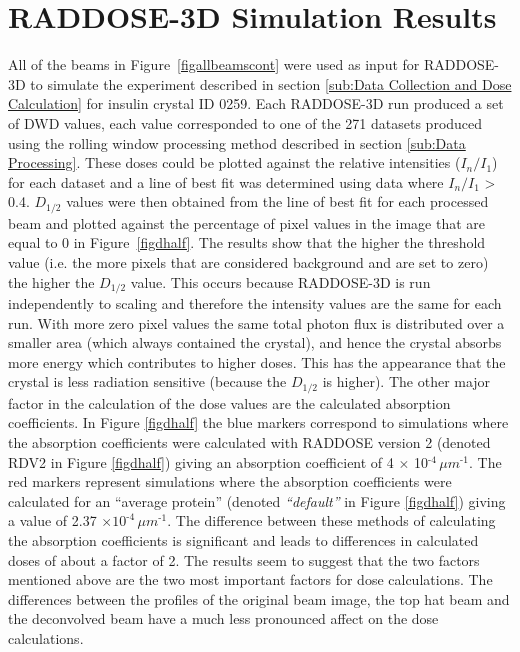\section{RADDOSE-3D Simulation Results}
All of the beams in Figure~\ref{figallbeamscont} were used as input for RADDOSE-3D to simulate the experiment described in section \ref{sub:Data Collection and Dose Calculation} for insulin crystal ID 0259.
Each RADDOSE-3D run produced a set of DWD values, each value corresponded to one of the 271 datasets produced using the rolling window processing method described in section \ref{sub:Data Processing}.
These doses could be plotted against the relative intensities ($I_n / I_1$) for each dataset and a line of best fit was determined using data where $I_n / I_1$ > 0.4.
$D_{1/2}$ values were then obtained from the line of best fit for each processed beam and plotted against the percentage of pixel values in the image that are equal to 0 in Figure~\ref{figdhalf}.
The results show that the higher the threshold value (i.e. the more pixels that are considered background and are set to zero) the higher the $D_{1/2}$ value.
This occurs because RADDOSE-3D is run independently to scaling and therefore the intensity values are the same for each run.
With more zero pixel values the same total photon flux is distributed over a smaller area (which always contained the crystal), and hence the crystal absorbs more energy which contributes to higher doses.
This has the appearance that the crystal is less radiation sensitive (because the $D_{1/2}$ is higher).
The other major factor in the calculation of the dose values are the calculated absorption coefficients.
In Figure \ref{figdhalf} the blue markers correspond to simulations where the absorption coefficients were calculated with RADDOSE version 2 \cite{pait2009} (denoted RDV2 in Figure \ref{figdhalf}) giving an absorption coefficient of 4 $\times$ 10$^{\text{-4}}\, \mu m^{\text{-1}}$.
The red markers represent simulations where the absorption coefficients were calculated for an ``average protein'' (denoted \textit{``default''} in Figure \ref{figdhalf}) giving a value of 2.37 $\times 10^{\text{-4}}\, \mu m^{\text{-1}}$.
The difference between these methods of calculating the absorption coefficients is significant and leads to differences in calculated doses of about a factor of 2.
\newline
The results seem to suggest that the two factors mentioned above are the two most important factors for dose calculations.
The differences between the profiles of the original beam image, the top hat beam and the deconvolved beam have a much less pronounced affect on the dose calculations.
